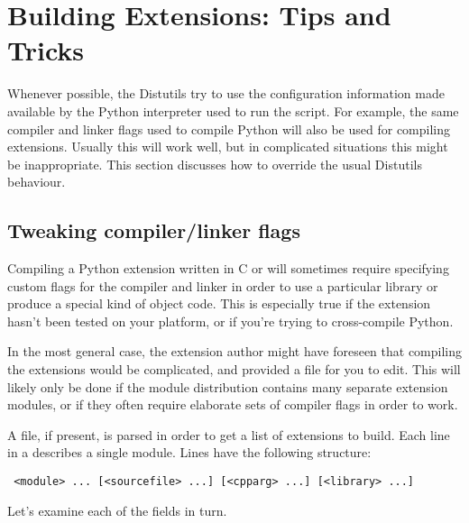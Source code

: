 \documentclass{howto}
\begin{document}
\section{Building Extensions: Tips and Tricks}
\label{building-ext}

Whenever possible, the Distutils try to use the configuration
information made available by the Python interpreter used to run the
 script.  For example, the same compiler and linker
flags used to compile Python will also be used for compiling
extensions.  Usually this will work well, but in complicated
situations this might be inappropriate.  This section discusses how to
override the usual Distutils behaviour.

\subsection{Tweaking compiler/linker flags}
\label{tweak-flags}

Compiling a Python extension written in C or \Cpp will sometimes
require specifying custom flags for the compiler and linker in order
to use a particular library or produce a special kind of object code.
This is especially true if the extension hasn't been tested on your 
platform, or if you're trying to cross-compile Python.

In the most general case, the extension author might have foreseen
that compiling the extensions would be complicated, and provided a
 file for you to edit.  This will likely only be done if
the module distribution contains many separate extension modules, or
if they often require elaborate sets of compiler flags in order to work.

A  file, if present, is parsed in order to get a list of
extensions to build.  Each line in a  describes a single
module.  Lines have the following structure:

\begin{verbatim}
 <module> ... [<sourcefile> ...] [<cpparg> ...] [<library> ...]
\end{verbatim}

Let's examine each of the fields in turn.
\end{document}
